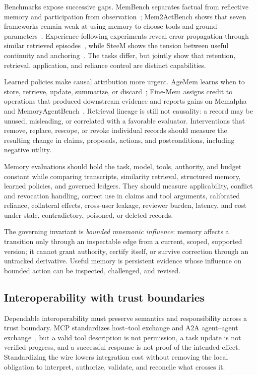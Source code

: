 Benchmarks expose successive gaps. MemBench separates factual from reflective memory and participation from observation~\cite{tan2025membench}; Mem2ActBench shows that seven frameworks remain weak at using memory to choose tools and ground parameters~\cite{shen2026mem2actbench}. Experience-following experiments reveal error propagation through similar retrieved episodes~\cite{xiong2026memorymanagement}, while SteeM shows the tension between useful continuity and anchoring~\cite{huang2026controllable}. The tasks differ, but jointly show that retention, retrieval, application, and reliance control are distinct capabilities.

Learned policies make causal attribution more urgent. AgeMem learns when to store, retrieve, update, summarize, or discard~\cite{yu2026agemem}; Fine-Mem assigns credit to operations that produced downstream evidence and reports gains on Memalpha and MemoryAgentBench~\cite{ma2026finemem}. Retrieval lineage is still not causality: a record may be unused, misleading, or correlated with a favorable evaluator. Interventions that remove, replace, rescope, or revoke individual records should measure the resulting change in claims, proposals, actions, and postconditions, including negative utility.

Memory evaluations should hold the task, model, tools, authority, and budget constant while comparing transcripts, similarity retrieval, structured memory, learned policies, and governed ledgers. They should measure applicability, conflict and revocation handling, correct use in claims and tool arguments, calibrated reliance, collateral effects, cross-user leakage, reviewer burden, latency, and cost under stale, contradictory, poisoned, or deleted records.

The governing invariant is \emph{bounded mnemonic influence}: memory affects a transition only through an inspectable edge from a current, scoped, supported version; it cannot grant authority, certify itself, or survive correction through an untracked derivative. Useful memory is persistent evidence whose influence on bounded action can be inspected, challenged, and revised.

\subsection{Interoperability with trust boundaries}

Dependable interoperability must preserve semantics and responsibility across a trust boundary. MCP standardizes host--tool exchange and A2A agent--agent exchange~\cite{mcp2025spec,a2a2026spec}, but a valid tool description is not permission, a task update is not verified progress, and a successful response is not proof of the intended effect. Standardizing the wire lowers integration cost without removing the local obligation to interpret, authorize, validate, and reconcile what crosses it.

